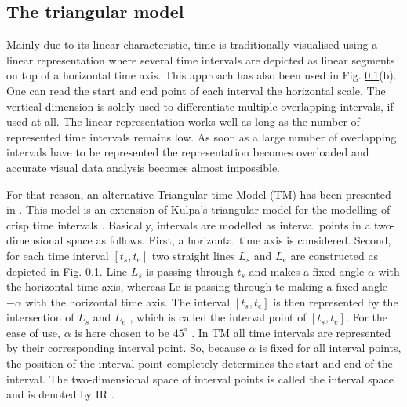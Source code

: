 % 



\subsection{\label{subsec:the-triangular-model}The triangular model}
Mainly due to its linear characteristic, time is traditionally visualised using a linear representation where several time intervals are depicted as linear segments on top of a horizontal time axis. This approach has also been used in Fig. \ref{}(b). One can read the start and end point of each interval the horizontal scale. The vertical dimension is solely used to differentiate multiple overlapping intervals, if used at all. The linear representation works well as long as the number of represented time intervals remains low. As soon as a large number of overlapping intervals have to be represented the representation becomes overloaded and accurate visual data analysis becomes almost impossible.

For that reason, an alternative Triangular time Model (TM) has been presented in \cite{Weghe2007}. This model is an extension of Kulpa's triangular model for the modelling of crisp time intervals \cite{Kulpa1997}. Basically, intervals are modelled as interval points in a two-dimensional space as follows. First, a horizontal time axis is considered. Second, for each time interval $\left[t_s, t_e \right]$ two straight lines $L_s$ and $L_e$ are constructed as depicted in Fig. \ref{}. Line $L_s$ is passing through $t_s$ and makes a fixed angle $\alpha$ with the horizontal time axis, whereas Le is passing through te making a fixed angle $-\alpha$ with the horizontal time axis. The interval $\left[t_s, t_e \right]$ is then represented by the intersection of $L_s$ and $L_e$ , which is called the interval point of $\left[t_s, t_e \right]$. For the ease of use, $\alpha$ is here chosen to be $45^{\circ}$ . In TM all time intervals are represented by their corresponding interval point. So, because $\alpha$ is fixed for all interval points, the position of the interval point completely determines the start and end of the interval. The two-dimensional space of interval points is called the interval space and is denoted by IR \cite{Kulpa2006}.

